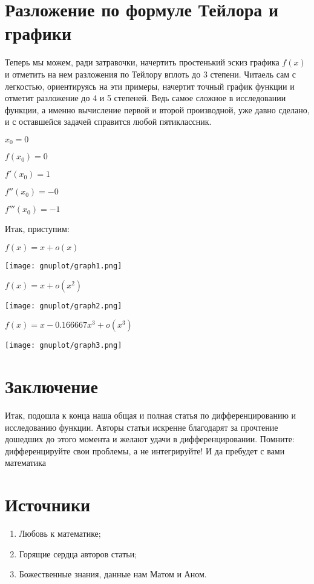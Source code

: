\documentclass{article}
\begin{document}
\section{Разложение по формуле Тейлора и графики}

Теперь мы можем, ради затравочки, начертить простенький эскиз графика $f(x)$ и отметить на нем разложения по Тейлору вплоть до 3 степени. Читаель сам с легкостью, ориентируясь на эти примеры, начертит точный график функции и отметит разложение до 4 и 5 степеней. Ведь самое сложное в исследовании функции, а именно вычисление первой и второй производной, уже давно сделано, и с оставшейся задачей справится любой пятиклассник.



$x_0 = 0$

$f(x_0) = 0$

$f'(x_0) = 1$

$f''(x_0) = -0$

$f'''(x_0) = -1$

Итак, приступим:

$f(x) = x +o(x)$

\texttt{[image: gnuplot/graph1.png]}

$f(x) = x +o(x^2)$

\texttt{[image: gnuplot/graph2.png]}

$f(x) = x -0.166667x^3 +o(x^3)$

\texttt{[image: gnuplot/graph3.png]}

\section{Заключение}

Итак, подошла к конца наша общая и полная статья по дифференцированию и исследованию функции. Авторы статьи искренне благодарят за прочтение дошедших до этого момента и желают удачи в дифференцировании. Помните: дифференцируйте свои проблемы, а не интегрируйте! И да пребудет с вами математика

\section*{Источники}
\begin{enumerate}
	\item Любовь к математике;
	\item Горящие сердца авторов статьи;
	\item Божественные знания, данные нам Матом и Аном.
\end{enumerate}
\end{document}
